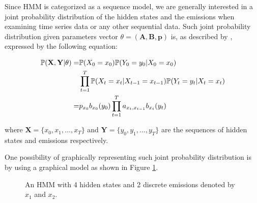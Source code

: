 Since HMM is categorized as a sequence model, we are generally interested in a joint probability distribution of the hidden states and the emissions when examining 
time series data or any other sequential data. Such joint probability distribution given parameters vector $\theta = (\textbf{A},\textbf{B},\textbf{p})$ is, as described by \cite{Rabiner1989}, 
expressed by the following equation:

\begin{align}
    \mathbb{P}(\textbf{X}, \textbf{Y}| \theta) = & \mathbb{P}(X_0 = x_0) \mathbb{P}(Y_0 = y_0|X_0 = x_0) \notag \\ 
                                                 & \prod_{t=1}^T \mathbb{P}(X_t = x_t|X_{t-1} = x_{t-1}) \mathbb{P}(Y_t = y_t|X_t = x_t) \\
                                               = & p_{x_0} b_{x_0}(y_0) \prod_{t=1}^T a_{x_t,x_{t-1}} b_{x_t}(y_t)
\end{align}

\noindent where $\textbf{X} = \{x_0,x_1,\ldots,x_T\}$ and $\textbf{Y} = \{y_0,y_1,\ldots,y_T\}$ are the sequences of hidden states and emissions respectively. 

One possibility of graphically representing such joint probability distribution is by using a graphical 
model as shown in Figure \ref{fig:HMM}. 

\begin{figure}[htbp]
\begin{center}
\end{center}
\caption{An HMM with 4 hidden states and 2 discrete emissions denoted by $x_1$ and $x_2$.}
\label{fig:HMM}
\end{figure}

